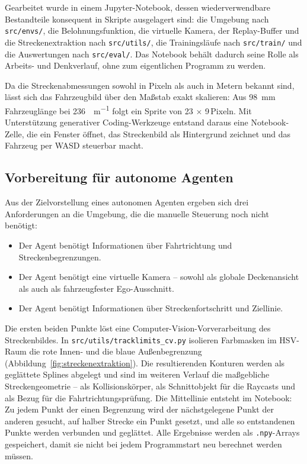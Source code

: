 Gearbeitet wurde in einem Jupyter-Notebook, dessen wiederverwendbare Bestandteile konsequent in Skripte ausgelagert sind: die Umgebung nach \texttt{src/envs/}, die Belohnungsfunktion, die virtuelle Kamera, der Replay-Buffer und die Streckenextraktion nach \texttt{src/utils/}, die Trainingsläufe nach \texttt{src/train/} und die Auswertungen nach \texttt{src/eval/}. Das Notebook behält dadurch seine Rolle als Arbeits- und Denkverlauf, ohne zum eigentlichen Programm zu werden.

Da die Streckenabmessungen sowohl in Pixeln als auch in Metern bekannt sind, lässt sich das Fahrzeugbild über den Maßstab exakt skalieren: Aus \SI{98}{\milli\meter} Fahrzeuglänge bei \SI{236}{\px\per\meter} folgt ein Sprite von \num{23} $\times$ \num{9}\,Pixeln. Mit Unterstützung generativer Coding-Werkzeuge entstand daraus eine Notebook-Zelle, die ein Fenster öffnet, das Streckenbild als Hintergrund zeichnet und das Fahrzeug per WASD steuerbar macht.

\subsection{Vorbereitung für autonome Agenten}
\label{subsubsec:vorbereitung}

Aus der Zielvorstellung eines autonomen Agenten ergeben sich drei Anforderungen an die Umgebung, die die manuelle Steuerung noch nicht benötigt:

\begin{itemize}
  \item Der Agent benötigt Informationen über Fahrtrichtung und Streckenbegrenzungen.
  \item Der Agent benötigt eine virtuelle Kamera -- sowohl als globale Deckenansicht als auch als fahrzeugfester Ego-Ausschnitt.
  \item Der Agent benötigt Informationen über Streckenfortschritt und Ziellinie.
\end{itemize}

Die ersten beiden Punkte löst eine Computer-Vision-Vorverarbeitung des Streckenbildes. In \texttt{src/utils/tracklimits\_cv.py} isolieren Farbmasken im \acs{HSV}-Raum die rote Innen- und die blaue Außenbegrenzung (Abbildung~\ref{fig:streckenextraktion}). Die resultierenden Konturen werden als geglättete Splines abgelegt und sind im weiteren Verlauf die maßgebliche Streckengeometrie -- als Kollisionskörper, als Schnittobjekt für die Raycasts und als Bezug für die Fahrtrichtungsprüfung. Die Mittellinie entsteht im Notebook: Zu jedem Punkt der einen Begrenzung wird der nächstgelegene Punkt der anderen gesucht, auf halber Strecke ein Punkt gesetzt, und alle so entstandenen Punkte werden verbunden und geglättet. Alle Ergebnisse werden als \texttt{.npy}-Arrays gespeichert, damit sie nicht bei jedem Programmstart neu berechnet werden müssen.

